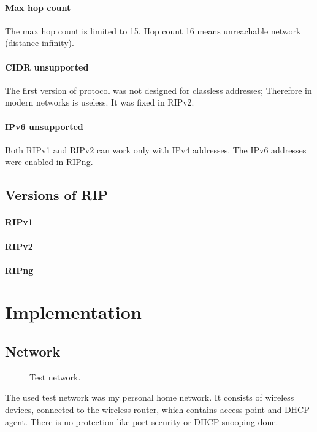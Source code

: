 \documentclass[10pt,a4paper,titlepage]{article}
\begin{document}
        \paragraph{Max hop count}
            The max hop count is limited to 15. Hop count 16 means unreachable network (distance infinity).

        \paragraph{CIDR unsupported}
            The first version of protocol was not designed for classless addresses; Therefore in modern networks is useless.
            It was fixed in RIPv2.

        \paragraph{IPv6 unsupported}
            Both RIPv1 and RIPv2 can work only with IPv4 addresses. The IPv6 addresses were enabled in RIPng.

    \subsection*{Versions of RIP}
        \paragraph{RIPv1}
        \paragraph{RIPv2}
        \paragraph{RIPng}


    




    
\section*{Implementation}
    
    \subsection*{Network}
    \begin{figure}[h!]
        \begin{center}
            \caption{ Test network. \label{fig:network} \cite{laptop}}
        \end{center}
    \end{figure}
    The used test network was my personal home network. It consists of wireless
    devices, connected to the wireless router, which contains access point and DHCP agent.
    There is no protection like port security or DHCP snooping done.
    
\end{document}
